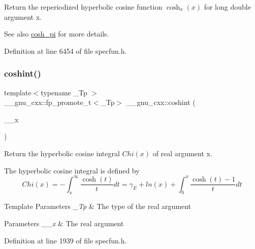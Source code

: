 Return the reperiodized hyperbolic cosine function $ \cosh_\pi(x) $ for {\ttfamily long double} argument {\ttfamily x}.

\begin{DoxySeeAlso}{See also}
\hyperlink{group__mathsf__gnu_gaf59c68a01adfdab0f22c4fb405ab2a36}{cosh\+\_\+pi} for more details. 
\end{DoxySeeAlso}


Definition at line 6454 of file specfun.\+h.

\mbox{\label{group__mathsf__gnu_ga2411d513d418180285ace6650c7b7e31}} 
\subsubsection{\texorpdfstring{coshint()}{coshint()}}
{\footnotesize\ttfamily template$<$typename \+\_\+\+Tp $>$ \\
\+\_\+\+\_\+gnu\+\_\+cxx\+::fp\+\_\+promote\+\_\+t$<$\+\_\+\+Tp$>$ \+\_\+\+\_\+gnu\+\_\+cxx\+::coshint (\begin{DoxyParamCaption}\item[{\+\_\+\+Tp}]{\+\_\+\+\_\+x }\end{DoxyParamCaption})\hspace{0.3cm}{\ttfamily [inline]}}

Return the hyperbolic cosine integral $ Chi(x) $ of real argument {\ttfamily x}.

The hyperbolic cosine integral is defined by \[ Chi(x) = -\int_x^\infty \frac{\cosh(t)}{t}dt = \gamma_E + ln(x) + \int_0^x \frac{\cosh(t)-1}{t}dt \]


\begin{DoxyTemplParams}{Template Parameters}
{\em \+\_\+\+Tp} & The type of the real argument \\
\hline
\end{DoxyTemplParams}

\begin{DoxyParams}{Parameters}
{\em \+\_\+\+\_\+x} & The real argument \\
\hline
\end{DoxyParams}


Definition at line 1939 of file specfun.\+h.

\mbox{\label{group__mathsf__gnu_ga1af4d48209169967a836bd97e625a128}} 
